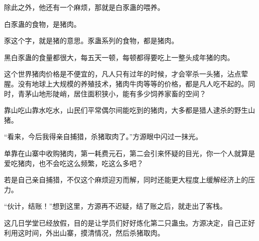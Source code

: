 \begin{this_body}
除此之外，他还有一个麻烦，那就是白豕蛊的喂养。

白豕蛊的食物，是猪肉。

豕这个字，就是猪的意思。豕蛊系列的食物，都是猪肉。

黑白豕蛊的食量都很大，每五天一顿，每顿都得要吃上一整头成年猪的肉。

这个世界猪肉价格是不便宜的，凡人只有过年的时候，才会宰杀一头猪，沾点荤腥。没有地球上大规模的养殖技术，猪肉牛肉等等的价格，都是凡人吃不起的。同时，青茅山地形陡峭，居住面积狭小，能有多少饲养家畜的空间？

靠山吃山靠水吃水，山民们平常偶尔间能吃到的猪肉，大多都是猎人逮杀的野生山猪。

“看来，今后我得亲自捕猎，杀猪取肉了。”方源眼中闪过一抹光。

单靠在山寨中收购猪肉，第一耗费元石，第二会引来怀疑的目光，你一个人就算是爱吃猪肉，也不会吃这么频繁，吃这么多吧？

若是自己亲自捕猎，不仅这个麻烦迎刃而解，同时还能更大程度上缓解经济上的压力。

“伙计，结账！”想到这里，方源再不迟疑，结了账之后，就走出了客栈。

这几日学堂已经放假，目的是让学员们好好炼化第二只蛊虫。方源决定，自己正好利用这时间，外出山寨，摸清情况，然后杀猪取肉。

\end{this_body}

